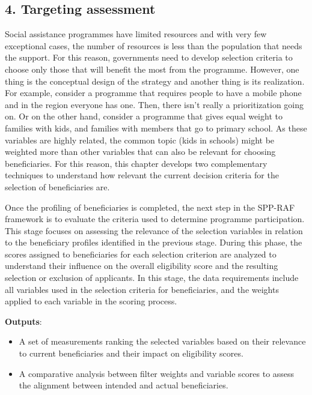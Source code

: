 \documentclass[
]{article}
\begin{document}
\subsection{4. Targeting assessment}\label{targeting-assessment}

Social assistance programmes have limited resources and with very few
exceptional cases, the number of resources is less than the population
that needs the support. For this reason, governments need to develop
selection criteria to choose only those that will benefit the most from
the programme. However, one thing is the conceptual design of the
strategy and another thing is its realization. For example, consider a
programme that requires people to have a mobile phone and in the region
everyone has one. Then, there isn't really a prioritization going on. Or
on the other hand, consider a programme that gives equal weight to
families with kids, and families with members that go to primary school.
As these variables are highly related, the common topic (kids in
schools) might be weighted more than other variables that can also be
relevant for choosing beneficiaries. For this reason, this chapter
develops two complementary techniques to understand how relevant the
current decision criteria for the selection of beneficiaries are.

Once the profiling of beneficiaries is completed, the next step in the
SPP-RAF framework is to evaluate the criteria used to determine
programme participation. This stage focuses on assessing the relevance
of the selection variables in relation to the beneficiary profiles
identified in the previous stage. During this phase, the scores assigned
to beneficiaries for each selection criterion are analyzed to understand
their influence on the overall eligibility score and the resulting
selection or exclusion of applicants. In this stage, the data
requirements include all variables used in the selection criteria for
beneficiaries, and the weights applied to each variable in the scoring
process.

\textbf{Outputs}:

\begin{itemize}
\item
  A set of measurements ranking the selected variables based on their
  relevance to current beneficiaries and their impact on eligibility
  scores.
\item
  A comparative analysis between filter weights and variable scores to
  assess the alignment between intended and actual beneficiaries.
\end{itemize}
\end{document}
